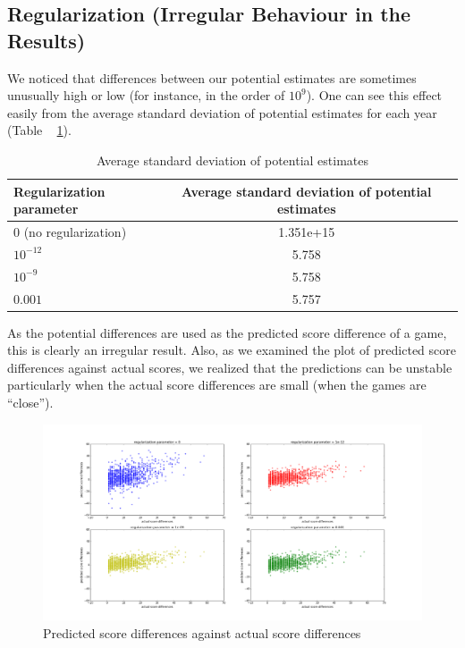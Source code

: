 \documentclass{article} %
\begin{document}
\subsection{Regularization (Irregular Behaviour in the Results)}
We noticed that differences between our potential estimates are sometimes unusually high or low (for instance, in the order of $10^9$).  One can see this effect easily from the average standard deviation of potential estimates for each year (Table ~ \ref{table:std}).

\begin{table}
\begin{center}
  \begin{tabular}{ | l | c | r | }
    \hline
    Regularization parameter & Average standard deviation of potential estimates \\ \hline
    0 (no regularization) & 1.351e+15 \\ \hline
    $10^{-12}$ & 5.758\\ \hline
    $10^{-9}$ & 5.758\\ \hline
    $0.001$ & 5.757\\
    \hline
  \end{tabular}
  \caption{Average standard deviation of potential estimates}
  \label{table:std}
\end{center}
\end{table}

As the potential differences are used as the predicted score difference of a game, this is clearly an irregular result.  Also, as we examined the plot of predicted score differences against actual scores, we realized that the predictions can be unstable particularly when the actual score differences are small (when the games are ``close''). 

\begin{figure}[ht!]
    \centering
    \includegraphics[width=140mm]{actual_vs_predict.png}
    \caption{Predicted score differences against actual score differences}
    \label{actual_vs_predict}
\end{figure}
\end{document}
